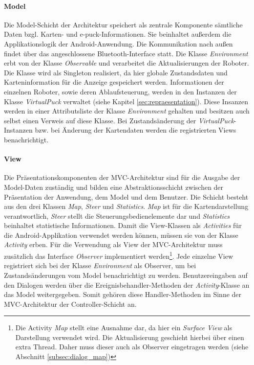 \documentclass[10pt,a4paper]{article}
\begin{document}
			\paragraph*{Model}
  				Die Model-Schicht der Architektur speichert als zentrale Komponente sämtliche Daten bzgl. Karten- und e-puck-Informationen. 
  				Sie beinhaltet außerdem die Applikationslogik der Android-Anwendung. Die Kommunikation nach außen findet über das
  				angeschlossene Bluetooth-Interface statt. Die Klasse \textit{Environment} erbt von der Klasse \textit{Observable} und verarbeitet
  				die Aktualisierungen der Roboter. Die Klasse wird als Singleton realisiert, da hier globale Zustandsdaten und Karteninformation
  				für die Anzeige gespeichert werden. Informationen der einzelnen Roboter, sowie deren Ablaufsteuerung, werden in den Instanzen
  				der Klasse \textit{VirtualPuck} verwaltet (siehe Kapitel \ref{sec:repraesentation}). Diese Insanzen werden in einer Attributsliste der Klasse
  				\textit{Environment} gehalten und besitzen auch selbst einen Verweis auf diese Klasse. Bei Zustandsänderung der \textit{VirtualPuck}-Instanzen
  				bzw. bei Änderung der Kartendaten werden die registrierten Views benachrichtigt.
  			\paragraph*{View}
  				Die Präsentationskomponenten der MVC-Architektur sind für die Ausgabe der Model-Daten zuständig und bilden eine
  				Abstraktionsschicht zwischen der Präsentation der Anwendung, dem Model und dem Benutzer. Die Schicht besteht aus den drei
  				Klassen	\textit{Map}, \textit{Steer} und \textit{Statistics}. \textit{Map} ist für die Kartendarstellung
  				verantwortlich, \textit{Steer} stellt die Steuerungsbedienelemente dar und \textit{Statistics} beinhaltet statistische
  				Informationen.  Damit die View-Klassen als \textit{Activities} für die Android-Applikation verwendet werden können, müssen sie
  				von der Klasse \textit{Activity} erben. Für die Verwendung als View der MVC-Architektur muss zusätzlich das Interface
  				\textit{Observer} implementiert werden\footnote{Die Activity \textit{Map} stellt eine Ausnahme dar, da hier ein \textit{Surface View} als
  				Darstellung verwendet wird. Die Aktualisierung geschieht hierbei über einen extra Thread. Daher muss dieser auch als Observer eingetragen
  				werden (siehe Abschnitt \ref{subsec:dialog_map})}. Jede einzelne View registriert sich bei der Klasse \textit{Environment} als Observer,
  				um bei Zustandsänderungen vom Model benachrichtigt zu werden. Benutzereingaben auf den Dialogen werden über
  				die Ereignisbehandler-Methoden der \textit{Activity}-Klasse an das Model weitergegeben. Somit gehören diese Handler-Methoden
  				im Sinne der MVC-Architektur der Controller-Schicht an.
\end{document}
